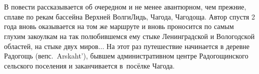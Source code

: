 \chapter*{}

В повести рассказывается об очередном и не менее авантюрном, чем прежние, сплаве по рекам бассейна Верхней Волги\mdash Лидь, Чагода, Чагодоща. Автор спустя 2 года вновь оказывается на том же маршруте и вновь проносится по самым глухим закоулкам на так полюбившемся ему стыке Ленинградской и Вологодской областей, на стыке двух миров$\ldots$ На этот раз путешествие начинается в деревне Радогощь (вепс.~Arskaht'), бывшем административном центре Радогощинского сельского поселения и заканчивается в~посёлке Чагода.
%
